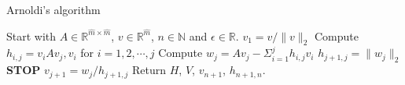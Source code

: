 \begin{algorithm} 
\begin{algorithmic} \caption{Arnoldi's algorithm\cite{arnold}} \label{alg:arnoldi}  
\STATE Start with $A \in \mathbb{R}^{\hat{m} \times \hat{m}}$, $v \in \mathbb{R}^{\hat{m}}$, $n \in \mathbb{N}$ and $\epsilon \in \mathbb{R}$.
\STATE $v_1 = v/\|v \|_2$
   \STATE Compute $h_{i,j} =  v_iAv_j,v_i $ for $i = 1,2,\cdots, j$
    \STATE Compute $w_j = A v_j - \Sigma_{i=1}^{j} h_{i,j}v_i $
    \STATE $h_{j+1,j} = \| w_j \|_2$
        \STATE\textbf{STOP}
    \ENDIF 
   \STATE $v_{j+1} = w_j/h_{j+1,j}$
\ENDFOR
\STATE Return $H$, $V$, $v_{n+1}$, $h_{n+1,n}$.
\end{algorithmic} 
\end{algorithm}

